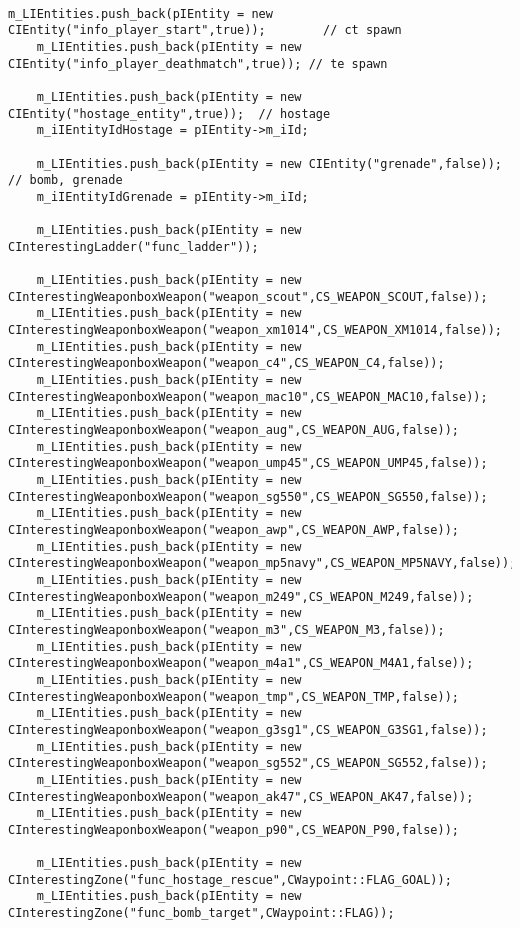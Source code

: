 \documentclass[12pt]{article}
\begin{document}
\scriptsize
\linespread{1.0}
\begin{verbatim}

m_LIEntities.push_back(pIEntity = new CIEntity("info_player_start",true));        // ct spawn
	m_LIEntities.push_back(pIEntity = new CIEntity("info_player_deathmatch",true)); // te spawn

	m_LIEntities.push_back(pIEntity = new CIEntity("hostage_entity",true));  // hostage
	m_iIEntityIdHostage = pIEntity->m_iId;

	m_LIEntities.push_back(pIEntity = new CIEntity("grenade",false));      // bomb, grenade
	m_iIEntityIdGrenade = pIEntity->m_iId;
	
	m_LIEntities.push_back(pIEntity = new CInterestingLadder("func_ladder"));
	
	m_LIEntities.push_back(pIEntity = new CInterestingWeaponboxWeapon("weapon_scout",CS_WEAPON_SCOUT,false));
	m_LIEntities.push_back(pIEntity = new CInterestingWeaponboxWeapon("weapon_xm1014",CS_WEAPON_XM1014,false));
	m_LIEntities.push_back(pIEntity = new CInterestingWeaponboxWeapon("weapon_c4",CS_WEAPON_C4,false));
	m_LIEntities.push_back(pIEntity = new CInterestingWeaponboxWeapon("weapon_mac10",CS_WEAPON_MAC10,false));
	m_LIEntities.push_back(pIEntity = new CInterestingWeaponboxWeapon("weapon_aug",CS_WEAPON_AUG,false));
	m_LIEntities.push_back(pIEntity = new CInterestingWeaponboxWeapon("weapon_ump45",CS_WEAPON_UMP45,false));
	m_LIEntities.push_back(pIEntity = new CInterestingWeaponboxWeapon("weapon_sg550",CS_WEAPON_SG550,false));
	m_LIEntities.push_back(pIEntity = new CInterestingWeaponboxWeapon("weapon_awp",CS_WEAPON_AWP,false));
	m_LIEntities.push_back(pIEntity = new CInterestingWeaponboxWeapon("weapon_mp5navy",CS_WEAPON_MP5NAVY,false));
	m_LIEntities.push_back(pIEntity = new CInterestingWeaponboxWeapon("weapon_m249",CS_WEAPON_M249,false));
	m_LIEntities.push_back(pIEntity = new CInterestingWeaponboxWeapon("weapon_m3",CS_WEAPON_M3,false));
	m_LIEntities.push_back(pIEntity = new CInterestingWeaponboxWeapon("weapon_m4a1",CS_WEAPON_M4A1,false));
	m_LIEntities.push_back(pIEntity = new CInterestingWeaponboxWeapon("weapon_tmp",CS_WEAPON_TMP,false));
	m_LIEntities.push_back(pIEntity = new CInterestingWeaponboxWeapon("weapon_g3sg1",CS_WEAPON_G3SG1,false));
	m_LIEntities.push_back(pIEntity = new CInterestingWeaponboxWeapon("weapon_sg552",CS_WEAPON_SG552,false));
	m_LIEntities.push_back(pIEntity = new CInterestingWeaponboxWeapon("weapon_ak47",CS_WEAPON_AK47,false));
	m_LIEntities.push_back(pIEntity = new CInterestingWeaponboxWeapon("weapon_p90",CS_WEAPON_P90,false));

	m_LIEntities.push_back(pIEntity = new CInterestingZone("func_hostage_rescue",CWaypoint::FLAG_GOAL));
	m_LIEntities.push_back(pIEntity = new CInterestingZone("func_bomb_target",CWaypoint::FLAG));

\end{verbatim}
\linespread{1.3}
\normalsize
\end{document}
